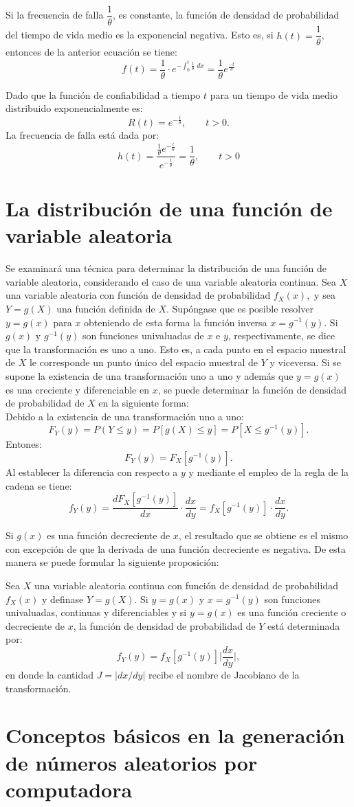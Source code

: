 Si la frecuencia de falla $\dfrac{1}{\theta}$, es constante, la función de densidad de probabilidad del tiempo de vida medio es la exponencial negativa. Esto es, si $h(t)=\dfrac{1}{\theta}$, entonces de la anterior ecuación se tiene:
$$f(t)=\dfrac{1}{\theta}\cdot e^{-\int_0^t \frac{1}{\theta}\; dx} = \dfrac{1}{\theta}e^{\frac{-t}{\theta}}$$

Dado que la función de confiabilidad a tiempo $t$ para un tiempo de vida medio distribuido exponencialmente es:
$$R(t)=e^{-\frac{t}{\theta}},\qquad t>0.$$
La frecuencia de falla está dada por:
$$h(t)=\dfrac{\frac{1}{\theta}e^{-\frac{t}{\theta}}}{e^{-\frac{t}{\theta}}}=\dfrac{1}{\theta},\qquad t>0$$


\section{La distribución de una función de variable aleatoria}
Se examinará una técnica para determinar la distribución de una función de variable aleatoria, considerando el caso de una variable aleatoria continua. Sea $X$ una variable aleatoria con función de densidad de probabilidad $f_X(x),$ y sea $Y=g(X)$ una función definida de $X$. Supóngase que es posible resolver $y=g(x)$ para $x$ obteniendo de esta forma la función inversa $x=g^{-1}(y)$. Si $g(x)$ y $g^{-1}(y)$ son funciones univaluadas de $x$ e $y$, respectivamente, se dice que la transformación es uno a uno. Esto es, a cada punto en el espacio muestral de $X$ le corresponde un punto único del espacio muestral de $Y$ y viceversa. Si se supone la existencia de una transformación uno a uno y además que $y=g(x)$ es una creciente y diferenciable en $x$, se puede determinar la función de densidad de probabilidad de $X$ en la siguiente forma:\\
Debido a la existencia de una transformación uno a uno:
$$F_Y(y)=P(Y\leq y)=P\left[g(X)\leq y\right] = P\left[X\leq g^{-1}(y)\right].$$
Entones:
$$F_Y(y)=F_X\left[g^{-1}(y)\right].$$
Al establecer la diferencia con respecto a $y$ y mediante el empleo de la regla de la cadena se tiene:
$$f_Y(y)=\dfrac{dF_X\left[g^{-1}(y)\right]}{dx}\cdot \dfrac{dx}{dy}=f_X\left[g^{-1}(y)\right]\cdot \dfrac{dx}{dy}.$$

Si $g(x)$ es una función decreciente de $x$, el resultado que se obtiene es el mismo con excepción de que la derivada de una función decreciente es negativa. De esta manera se puede formular la siguiente proposición:\\

\begin{teo}
    Sea $X$ una variable aleatoria continua con función de densidad de probabilidad $f_X(x)$ y definase $Y=g(X)$. Si $y=g(x)$ y $x=g^{-1}(y)$ son funciones univaluadas, continuas y diferenciables y si $y=g(x)$ es una función creciente o decreciente de $x$, la función de densidad de probabilidad de $Y$ está determinada por:
    $$f_Y(y)=f_X\left[g^{-1}(y)\right]\bigg|\dfrac{dx}{dy}\bigg|,$$
    en donde la cantidad $J=| dx/dy |$ recibe el nombre de Jacobiano de la transformación.
\end{teo}


\section{Conceptos básicos en la generación de números aleatorios por computadora}

